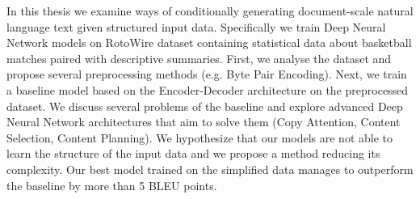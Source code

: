 \documentclass[12pt]{report}
\begin{document}

In this thesis we examine ways of conditionally generating document-scale natural language text given structured input data. Specifically we train Deep Neural Network models on  RotoWire dataset containing statistical data about basketball matches paired with descriptive summaries. First, we analyse the dataset and propose several preprocessing methods (e.g. Byte Pair Encoding). Next, we train a baseline model based on the Encoder-Decoder architecture on the preprocessed dataset. We discuss several problems of the baseline and explore advanced Deep Neural Network architectures that aim to solve them (Copy Attention, Content Selection, Content Planning). We hypothesize that our models are not able to learn the structure of the input data and we propose a method reducing its complexity. Our best model trained on the simplified data manages to outperform the baseline by more than 5 BLEU points.
\end{document}
